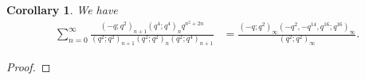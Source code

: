 \documentclass[reqno,12pt]{amsart}
\newtheorem{corollary}[theorem]{Corollary}
\theoremstyle{remark}
\numberwithin{equation}{section}
\begin{document}
%
%
\begin{corollary}
We have
\begin{align}
\sum_{n=0}^{\infty}\frac{\left(-q;q^2\right)_{n+1}\left(q^4;q^4\right)_n
q^{n^2+2n}}
{\left(q^2;q^2\right)_{n+1}\left(q^2;q^2\right)_n\left(q^2;q^4\right)_{n+1}}
&=\frac{\left(-q;q^2\right)_{\infty}\left(-q^2,-q^{14},q^{16};q^{16}\right)_{\infty}}
{\left(q^2;q^2\right)_{\infty}}.\tag{S.69}\label{S.69}
\end{align}
\end{corollary}
\begin{proof}

\end{proof}
\end{document}
